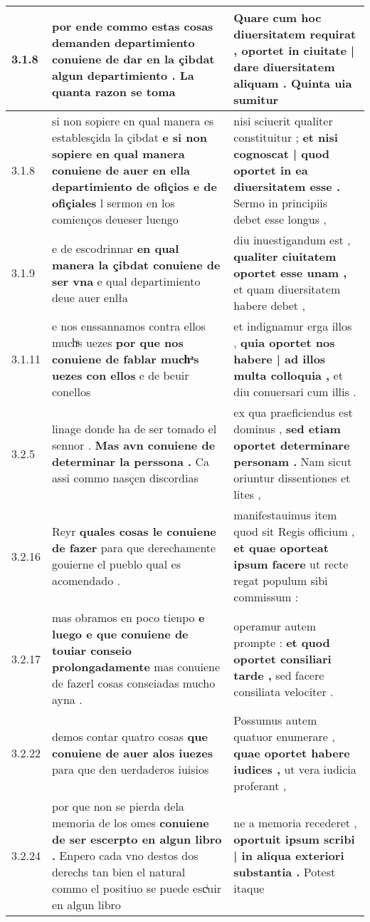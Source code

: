 \begin{tabular}{|p{1cm}|p{6.5cm}|p{6.5cm}|}
3.1.8 & por ende commo estas cosas demanden departimiento \textbf{ conuiene de dar en la çibdat algun departimiento . } La quanta razon se toma & Quare cum hoc diuersitatem requirat , \textbf{ oportet in ciuitate | dare diuersitatem aliquam . } Quinta uia sumitur \\\hline
3.1.8 & si non sopiere en qual manera es establesçida la çibdat \textbf{ e si non sopiere en qual manera conuiene de auer en ella departimiento de ofiçios e de ofiçiales } l sermon en los comienços deueser luengo & nisi sciuerit qualiter constituitur ; \textbf{ et nisi cognoscat | quod oportet in ea diuersitatem esse . } Sermo in principiis debet esse longus , \\\hline
3.1.9 & e de escodrinnar \textbf{ en qual manera la çibdat conuiene de ser vna } e qual departimiento deue auer enlła & diu inuestigandum est , \textbf{ qualiter ciuitatem oportet esse unam , } et quam diuersitatem habere debet , \\\hline
3.1.11 & e nos enssannamos contra ellos muchͣs uezes \textbf{ por que nos conuiene de fablar muchͣs uezes con ellos } e de beuir conellos & et indignamur erga illos , \textbf{ quia oportet nos habere | ad illos multa colloquia , } et diu conuersari cum illis . \\\hline
3.2.5 & linage donde ha de ser tomado el sennor . \textbf{ Mas avn conuiene de determinar la perssona . } Ca assi commo nasçen discordias & ex qua praeficiendus est dominus , \textbf{ sed etiam oportet determinare personam . } Nam sicut oriuntur dissentiones et lites , \\\hline
3.2.16 & Reyr \textbf{ quales cosas le conuiene de fazer } para que derechamente gouierne el pueblo qual es acomendado . & manifestauimus item quod sit Regis officium , \textbf{ et quae oporteat ipsum facere } ut recte regat populum sibi commissum : \\\hline
3.2.17 & mas obramos en poco tienpo \textbf{ e luego e que conuiene de touiar conseio prolongadamente } mas conuiene de fazerl cosas conseiadas mucho ayna . & operamur autem prompte : \textbf{ et quod oportet consiliari tarde , } sed facere consiliata velociter . \\\hline
3.2.22 & demos contar quatro cosas \textbf{ que conuiene de auer alos iuezes } para que den uerdaderos iuisios & Possumus autem quatuor enumerare , \textbf{ quae oportet habere iudices , } ut vera iudicia proferant , \\\hline
3.2.24 & por que non se pierda dela memoria de los omes \textbf{ conuiene de ser escerpto en algun libro . } Enpero cada vno destos dos derechs tan bien el natural commo el positiuo se puede escͥuir en algun libro & ne a memoria recederet , \textbf{ oportuit ipsum scribi | in aliqua exteriori substantia . } Potest itaque \\\hline

\end{tabular}
